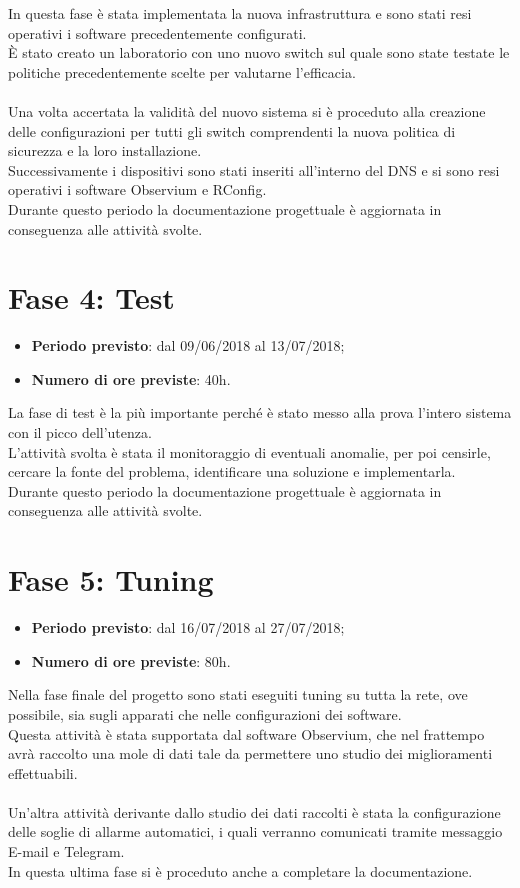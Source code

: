 \documentclass[Tesi.tex]{subfiles}
\begin{document}
In questa fase è stata implementata la nuova infrastruttura e sono stati resi operativi i software precedentemente configurati. \\
\`{E} stato creato un laboratorio con uno nuovo switch sul quale sono state testate le politiche precedentemente scelte per valutarne l'efficacia.\\\\
Una volta accertata la validità del nuovo sistema si è proceduto alla creazione delle configurazioni per tutti gli switch comprendenti la nuova politica di sicurezza e la loro installazione. \\
Successivamente i dispositivi sono stati inseriti all'interno del DNS e si sono resi operativi i software Observium e RConfig. \\
Durante questo periodo la documentazione progettuale è aggiornata in conseguenza alle attività svolte.


\section{Fase 4: Test}
\begin{itemize}
	\item \textbf{Periodo previsto}: dal 09/06/2018 al 13/07/2018;
	\item \textbf{Numero di ore previste}: 40h.
\end{itemize}
	
La fase di test è la più importante perché è stato messo alla prova l'intero sistema con il picco dell'utenza. \\
L'attività svolta è stata il monitoraggio di eventuali anomalie, per poi censirle, cercare la fonte del problema, identificare una soluzione e implementarla. \\
Durante questo periodo la documentazione progettuale è aggiornata in conseguenza alle attività svolte.

	

\section{Fase 5: Tuning}
\begin{itemize}
	\item \textbf{Periodo previsto}: dal 16/07/2018 al 27/07/2018;
	\item \textbf{Numero di ore previste}: 80h.
\end{itemize}
	
Nella fase finale del progetto sono stati eseguiti tuning su tutta la rete, ove possibile, sia sugli apparati che nelle configurazioni dei software. \\
Questa attività è stata supportata dal software Observium, che nel frattempo avrà raccolto una mole di dati tale da permettere uno studio dei miglioramenti effettuabili.\\\\
Un'altra attività derivante dallo studio dei dati raccolti è stata la configurazione delle soglie di allarme automatici, i quali verranno comunicati tramite messaggio E-mail e Telegram. \\
In questa ultima fase si è proceduto anche a completare la documentazione. 
\end{document}
